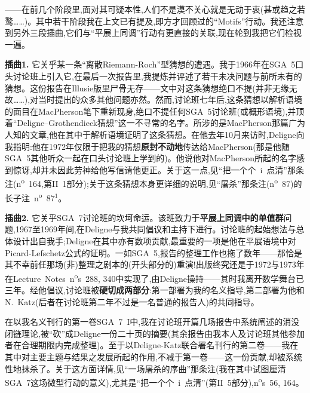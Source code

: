 ——在前几个阶段里,面对其可疑本性,人们不是漠不关心就是无动于衷(甚或趋之若鹜……)。其中若干阶段我在上文已有提及,即方才回顾过的“Motifs”行动。我还注意到另外三段插曲,它们与“平展上同调”行动有更直接的关联,现在轮到我把它们检视一遍。

\textbf{插曲1.} 它关乎某一条“离散Riemann-Roch”型猜想的遭遇\dmark{}。我于1966年在SGA~5口头讨论班上引入它,在最后一次报告里,我提炼并评述了若干未决问题与前所未有的猜想。这份报告在Illusie版里尸骨无存——文中对这条猜想绝口不提(并非无缘无故……),对当时提出的众多其他问题亦然。然而,讨论班七年后,这条猜想以解析语境的面目在MacPherson笔下重新现身,绝口不提任何SGA~5讨论班(或概形语境),并顶着“Deligne--Grothendieck猜想”这一不寻常的名字。所涉的是MacPherson那篇广为人知的文章,他在其中于解析语境证明了这条猜想。在他去年10月来访时,Deligne向我指明:他在1972年仅限于把我的猜想\textbf{原封不动地}传达给MacPherson(那是他随SGA~5其他听众一起在口头讨论班上学到的)。他说他对MacPherson所起的名字感到惊讶,却并未因此劳神给他写信请他更正。关于这一点,见“把一个个~i~点清”那条注(n\textsuperscript{o}~164,第II~1部分);关于这条猜想本身更详细的说明,见“屠杀”那条注(n\textsuperscript{o}~87)的长子注~n\textsuperscript{o}~87$^1$。

\textbf{插曲2.} 它关乎SGA~7讨论班的坎坷命运。该班致力于\textbf{平展上同调中的单值群}问题,1967至1969年间,在Deligne与我共同倡议和主持下进行。讨论班的起始想法与总体设计出自我手;Deligne在其中亦有数项贡献,最重要的一项是他在平展语境中对Picard-Lefschetz公式的证明。一如SGA~5,报告的整理工作也拖了数年——那恰是其不幸前任那场(非)整理之剧本的(开头部分的)重演!出版终究还是于1972与1973年在Lecture~Notes~n\textsuperscript{o}s~288, 340中实现了,由Deligne操持——其时我离开数学舞台已三年。经他倡议,讨论班被\textbf{硬切成两部分}:第一部署为我的名义指导,第二部署为他和N.~Katz(后者在讨论班第二年不过是一名普通的报告人)的共同指导。

在以我名义刊行的第一卷SGA~7~I中,我在讨论班开篇几场报告中系统阐述的消没闭链理论,被“砍”成Deligne一份二十页的摘要(其余报告由我本人及讨论班其他参加者在合理期限内完成整理)。至于以Deligne-Katz联合署名刊行的第二卷——我在其中对主要主题与结果之发展所起的作用,不减于第一卷——这一份贡献,却被系统性地抹杀了\dmark{}。关于这方面详情,见“一场屠杀的序曲”那条注(我在其中试图厘清SGA~7这场微型行动的意义),尤其是“把一个个~i~点清”(第II~5部分),n\textsuperscript{o}s~56, 164。

